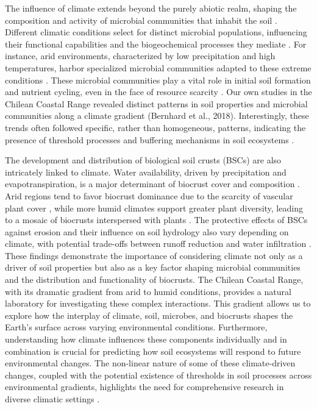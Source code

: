 The influence of climate extends beyond the purely abiotic realm, shaping the composition and activity of microbial communities that inhabit the soil \citep{Nemergut2005}. Different climatic conditions select for distinct microbial populations, influencing their functional capabilities and the biogeochemical processes they mediate \citep{Newsham2016}. For instance, arid environments, characterized by low precipitation and high temperatures, harbor specialized microbial communities adapted to these extreme conditions \citep{Pearce2012}. These microbial communities play a vital role in initial soil formation and nutrient cycling, even in the face of resource scarcity \citep{Bernhard2018}. Our own studies in the Chilean Coastal Range revealed distinct patterns in soil properties and microbial communities along a climate gradient (Bernhard et al., 2018). Interestingly, these trends often followed specific, rather than homogeneous, patterns, indicating the presence of threshold processes and buffering mechanisms in soil ecosystems \citep{Bernhard2018}.

The development and distribution of biological soil crusts (BSCs) are also intricately linked to climate. Water availability, driven by precipitation and evapotranspiration, is a major determinant of biocrust cover and composition \citep{Bowker2016}. Arid regions tend to favor biocrust dominance due to the scarcity of vascular plant cover \citep{Colesie2016,Grote2010}, while more humid climates support greater plant diversity, leading to a mosaic of biocrusts interspersed with plants \citep{Issa1999}. The protective effects of BSCs against erosion and their influence on soil hydrology also vary depending on climate, with potential trade-offs between runoff reduction and water infiltration \citep{Thielen2021}. These findings demonstrate the importance of considering climate not only as a driver of soil properties but also as a key factor shaping microbial communities and the distribution and functionality of biocrusts. The Chilean Coastal Range, with its dramatic gradient from arid to humid conditions, provides a natural laboratory for investigating these complex interactions. This gradient allows us to explore how the interplay of climate, soil, microbes, and biocrusts shapes the Earth’s surface across varying environmental conditions. Furthermore, understanding how climate influences these components individually and in combination is crucial for predicting how soil ecosystems will respond to future environmental changes. The non-linear nature of some of these climate-driven changes, coupled with the potential existence of thresholds in soil processes across environmental gradients, highlights the need for comprehensive research in diverse climatic settings \citep{Bernhard2018}.

